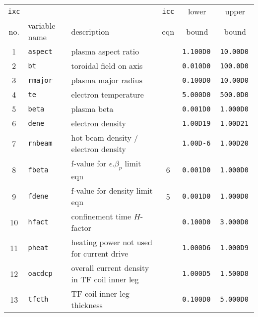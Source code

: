 \documentclass[11pt,a4paper]{report}
\begin{document}
\begin{table}[tbph]
\footnotesize
\begin{center}

\begin{tabular}{||c|l|l|c|c|c||} \hline
{\tt ixc} &           &                                                         & {\tt icc} & lower        & upper       \\
no. & variable name   & description                                             & eqn       & bound        & bound       \\ \hline
1   & \tt aspect      & plasma aspect ratio                                     &           & \tt 1.100D0  & \tt 10.00D0 \\
2   & \tt bt          & toroidal field on axis                                  &           & \tt 0.010D0  & \tt 100.0D0 \\
3   & \tt rmajor      & plasma major radius                                     &           & \tt 0.100D0  & \tt 10.00D0 \\
4   & \tt te          & electron temperature                                    &           & \tt 5.000D0  & \tt 500.0D0 \\
5   & \tt beta        & plasma beta                                             &           & \tt 0.001D0  & \tt 1.000D0 \\
6   & \tt dene        & electron density                                        &           & \tt 1.00D19  & \tt 1.00D21 \\
7   & \tt rnbeam      & hot beam density / electron density                     &           & \tt 1.00D-6  & \tt 1.00D20 \\
8   & \tt fbeta       & f-value for $\epsilon.\beta_p$ limit eqn                & 6         & \tt 0.001D0  & \tt 1.000D0 \\
9   & \tt fdene       & f-value for density limit eqn                           & 5         & \tt 0.001D0  & \tt 1.000D0 \\
10  & \tt hfact       & confinement time $H$-factor                             &           & \tt 0.100D0  & \tt 3.000D0 \\
11  & \tt pheat       & heating power not used for current drive                &           & \tt 1.000D6  & \tt 1.000D9 \\
12  & \tt oacdcp      & overall current density in TF coil inner leg            &           & \tt 1.000D5  & \tt 1.500D8 \\
13  & \tt tfcth       & TF coil inner leg thickness                             &           & \tt 0.100D0  & \tt 5.000D0 \\

\end{tabular}
\end{center}
\end{table}
\end{document}

